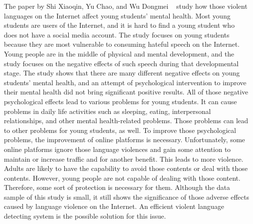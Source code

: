 \documentclass[11pt, natbib=false]{article}
\begin{document}
The paper by Shi Xiaoqin, Yu Chao, and Wu Dongmei ~\cite{shi2021influence} study how those violent languages on the Internet affect young students' mental health.
Most young students are users of the Internet, and it is hard to find a young student who does not have a social media account.
The study focuses on young students because they are most vulnerable to consuming hateful speech on the Internet.
Young people are in the middle of physical and mental development, and the study focuses on the negative effects of such speech during that developmental stage.
The study shows that there are many different negative effects on young students’ mental health, and an attempt of psychological intervention to improve their mental health did not bring significant positive results.
All of those negative psychological effects lead to various problems for young students.
It can cause problems in daily life activities such as sleeping, eating, interpersonal relationships, and other mental health-related problems.
Those problems can lead to other problems for young students, as well. To improve those psychological problems, the improvement of online platforms is necessary.
Unfortunately, some online platforms ignore those language violences and gain some attention to maintain or increase traffic and for another benefit.
This leads to more violence. Adults are likely to have the capability to avoid those contents or deal with those contents.
However, young people are not capable of dealing with those content. Therefore, some sort of protection is necessary for them.
Although the data sample of this study is small, it still shows the significance of those adverse effects caused by language violence on the Internet.
An efficient violent language detecting system is the possible solution for this issue. 
\end{document}
